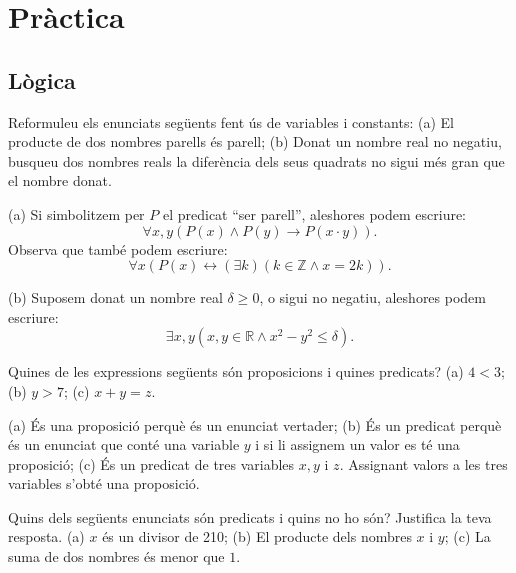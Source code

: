 \chapter{Pràctica}
\label{cap:practica}

\section{L\`{o}gica}

\begin{exercici}
Reformuleu els enunciats seg\"{u}ents fent \'{u}s de variables i constants:
(a) El producte de dos nombres parells \'{e}s parell; (b) Donat un nombre real
no negatiu, busqueu dos nombres reals la difer\`{e}ncia dels seus quadrats no
sigui m\'{e}s gran que el nombre donat.
\end{exercici}

\begin{solucio}
(a) Si simbolitzem per $P$ el predicat \textquotedblleft ser
parell\textquotedblright, aleshores podem escriure:%
\[
\forall x,y\left(  P\left(  x\right)  \wedge P\left(  y\right)
\longrightarrow P\left(  x\cdot y\right)  \right)  \text{.}%
\]
Observa que tamb\'{e} podem escriure:%
\[
\forall x\left(  P\left(  x\right)  \longleftrightarrow\left(  \exists
k\right)  \left(  k\in\mathbb{Z}\wedge x=2k\right)  \right)  \text{.}%
\]


(b) Suposem donat un nombre real $\delta\geq0$, o sigui no negatiu, aleshores
podem escriure:%
\[
\exists x,y\left(  x,y\in\mathbb{R}\wedge x^{2}-y^{2}\leq\delta\right)
\text{.}%
\]

\end{solucio}

\begin{exercici}
Quines de les expressions seg\"{u}ents s\'{o}n proposicions i quines
predicats? (a) $4<3$; (b) $y>7$; (c) $x+y=z$.
\end{exercici}

\begin{solucio}
(a) \'{E}s una proposici\'{o} perqu\`{e} \'{e}s un enunciat vertader; (b)
\'{E}s un predicat perqu\`{e} \'{e}s un enunciat que cont\'{e} una variable
$y$ i si li assignem un valor es t\'{e} una proposici\'{o}; (c) \'{E}s un
predicat de tres variables $x,y$ i $z$. Assignant valors a les tres variables
s'obt\'{e} una proposici\'{o}.
\end{solucio}

\begin{exercici}
Quins dels seg\"{u}ents enunciats s\'{o}n predicats i quins no ho s\'{o}n?
Justifica la teva resposta. (a) $x$ \'{e}s un divisor de 210; (b) El producte
dels nombres $x$ i $y$; (c) La suma de dos nombres és menor que $1$.
\end{exercici}

